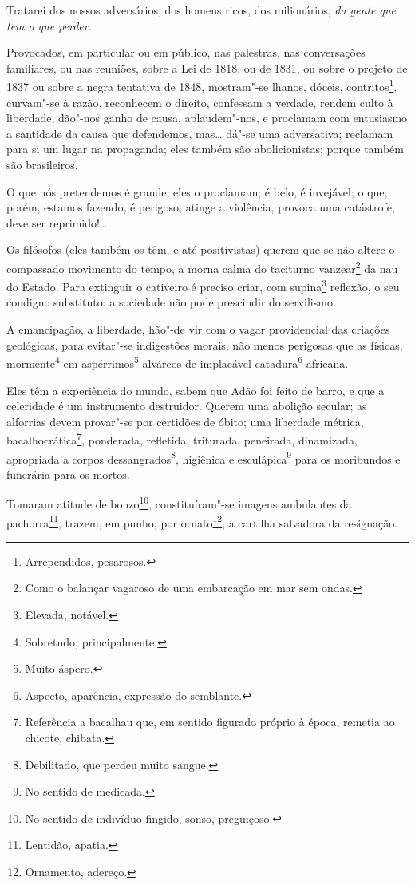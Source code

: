 Tratarei dos nossos adversários, dos homens ricos, dos milionários,
\emph{da gente que tem o que perder}.

Provocados, em particular ou em público, nas palestras, nas conversações
familiares, ou nas reuniões, sobre a Lei de 1818, ou de 1831, ou sobre o
projeto de 1837 ou sobre a negra tentativa de 1848, mostram"-se lhanos,
dóceis, contritos\footnote{Arrependidos, pesarosos.}, curvam"-se à
razão, reconhecem o direito, confessam a verdade, rendem culto à
liberdade, dão"-nos ganho de causa, aplaudem"-nos, e proclamam com
entusiasmo a santidade da causa que defendemos, mas\ldots{} dá"-se uma
adversativa; reclamam para si um lugar na propaganda; eles também são
abolicionistas; porque também são brasileiros.

O que nós pretendemos é grande, eles o proclamam; é belo, é invejável; o
que, porém, estamos fazendo, é perigoso, atinge a violência, provoca uma
catástrofe, deve ser reprimido!\ldots{}

Os filósofos (eles também os têm, e até positivistas) querem que se não
altere o compassado movimento do tempo, a morna calma do taciturno
vanzear\footnote{Como o balançar vagaroso de uma embarcação em mar sem
  ondas.} da nau do Estado. Para extinguir o cativeiro é preciso criar,
com supina\footnote{Elevada, notável.} reflexão, o seu condigno
substituto: a sociedade não pode prescindir do servilismo.

A emancipação, a liberdade, hão"-de vir com o vagar providencial das
criações geológicas, para evitar"-se indigestões morais, não menos
perigosas que as físicas, mormente\footnote{Sobretudo, principalmente.}
em aspérrimos\footnote{Muito áspero.} alváreos de implacável
catadura\footnote{Aspecto, aparência, expressão do semblante.}
africana.

Eles têm a experiência do mundo, sabem que Adão foi feito de barro, e
que a celeridade é um instrumento destruidor. Querem uma abolição
secular; as alforrias devem provar"-se por certidões de óbito; uma
liberdade métrica, bacalhocrática\footnote{Referência a bacalhau que,
  em sentido figurado próprio à época, remetia ao chicote, chibata.},
ponderada, refletida, triturada, peneirada, dinamizada, apropriada a
corpos dessangrados\footnote{Debilitado, que perdeu muito sangue.},
higiênica e esculápica\footnote{No sentido de medicada.} para os
moribundos e funerária para os mortos.

Tomaram atitude de bonzo\footnote{No sentido de indivíduo fingido,
  sonso, preguiçoso.}, constituíram"-se imagens ambulantes da
pachorra\footnote{Lentidão, apatia.}, trazem, em punho, por
ornato\footnote{Ornamento, adereço.}, a cartilha salvadora da
resignação.


